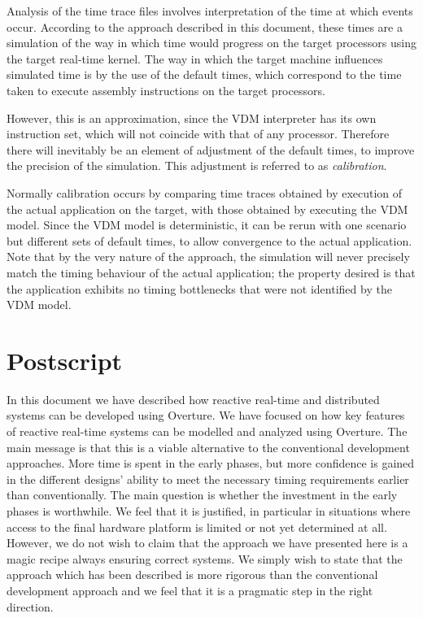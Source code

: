 \documentclass{overturerepchap}
\begin{document}
Analysis of the time trace files involves interpretation of the time
at which events occur.  According to the approach described in this
document, these times are a simulation of the way in which time would
progress on the target processors using the target real-time kernel. The
way in which the target machine influences simulated time is by the use
of the default times, which correspond to the time taken to execute
assembly instructions on the target processors.

However, this is an approximation, since the VDM interpreter has its
own instruction set, which will not coincide with that of any
processor. Therefore there will inevitably be an element of adjustment
of the default times, to improve the precision of the simulation. This
adjustment is referred to as \emph{calibration}.

Normally calibration occurs by comparing time traces obtained by
execution of the actual application on the target, with those obtained
by executing the VDM model.  Since the VDM model is deterministic,
it can be rerun with one scenario but different sets of default times,
to allow convergence to the actual application. Note that by the very
nature of the approach, the simulation will never precisely match the
timing behaviour of the actual application; the property desired is
that the application exhibits no timing bottlenecks that were not
identified by the VDM model.

\chapter{Postscript}\label{chap:postscript}

In this document we have described how reactive real-time and distributed systems can
be developed using Overture. We have focused on how key features of
reactive real-time systems can be modelled and analyzed using
Overture. The main message is that this is a viable alternative to
the conventional development approaches. More time is spent in the
early phases, but more confidence is gained in the different designs'
ability to meet the necessary timing requirements earlier than
conventionally. The main question is whether the investment in the
early phases is worthwhile. We feel that it is justified, in
particular in situations where access to the final hardware platform
is limited or not yet determined at all. However, we do not wish to
claim that the approach we have presented here is a magic recipe
always ensuring correct systems. We simply wish to state that the
approach which has been described is more rigorous than the
conventional development approach and we feel that it is a pragmatic
step in the right direction.
\end{document}
